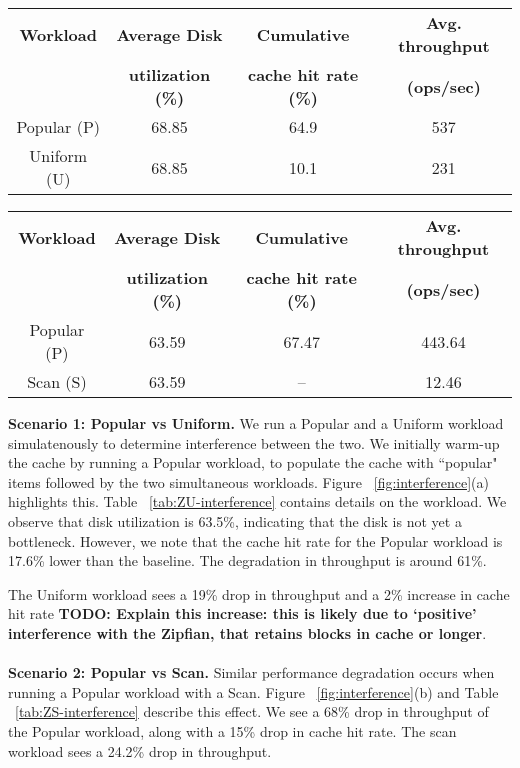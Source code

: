 \documentclass[twocolumn]{article}
\begin{document}
\begin{table*}[ht!]\footnotesize
\centering
\begin{tabular}{ | c | c | c | c |   }
  \hline
\textbf{Workload} & \textbf{Average Disk } & \textbf{Cumulative} & \textbf{Avg. throughput} \\
            & \textbf{utilization (\%)} & \textbf{cache hit rate (\%)} & \textbf{(ops/sec)}\\
\hline
Popular (P)  & 68.85 & 64.9 & 537 \\
Uniform (U)  & 68.85 & 10.1 & 231 \\
\hline
\end{tabular}
\label{tab:ZU-interference}
\caption{Popular and Uniform}



\begin{tabular}{ | c | c | c | c |   }
  \hline
\textbf{Workload} & \textbf{Average Disk } & \textbf{Cumulative} & \textbf{Avg. throughput} \\
            & \textbf{utilization (\%)} & \textbf{cache hit rate (\%)} & \textbf{(ops/sec)}\\
\hline
Popular (P)  & 63.59 & 67.47 & 443.64 \\
Scan (S) & 63.59 & -- & 12.46 \\ 
\hline
\end{tabular}
\caption{Popular and Scan}  
\label{tab:ZS-interference}
\end{table*}

\textbf{Scenario 1: Popular vs Uniform.} 
We run a Popular and a Uniform workload simulatenously to determine interference between the two. We initially warm-up the cache by running a Popular workload, to populate the cache with ``popular" items followed by the two simultaneous workloads. Figure ~\ref{fig:interference}(a) highlights this. Table ~\ref{tab:ZU-interference} contains details on the workload. We observe that disk utilization is 63.5\%, indicating that the disk is not yet a bottleneck. However, we note that the cache hit rate for the Popular workload is 17.6\% lower than the baseline. The degradation in throughput is around 61\%.

The Uniform workload sees a 19\% drop in throughput and a 2\% increase in cache hit rate \textbf{TODO: Explain this increase: this is likely due to `positive' interference with the Zipfian, that retains blocks in cache or longer}. 
\\
\\
\textbf{Scenario 2: Popular vs Scan.}
Similar performance degradation occurs when running a Popular workload with a Scan. Figure ~\ref{fig:interference}(b) and Table ~\ref{tab:ZS-interference} describe this effect. We see a 68\% drop in throughput of the Popular workload, along with a 15\% drop in cache hit rate. The scan workload sees a 24.2\% drop in throughput.
\end{document}
